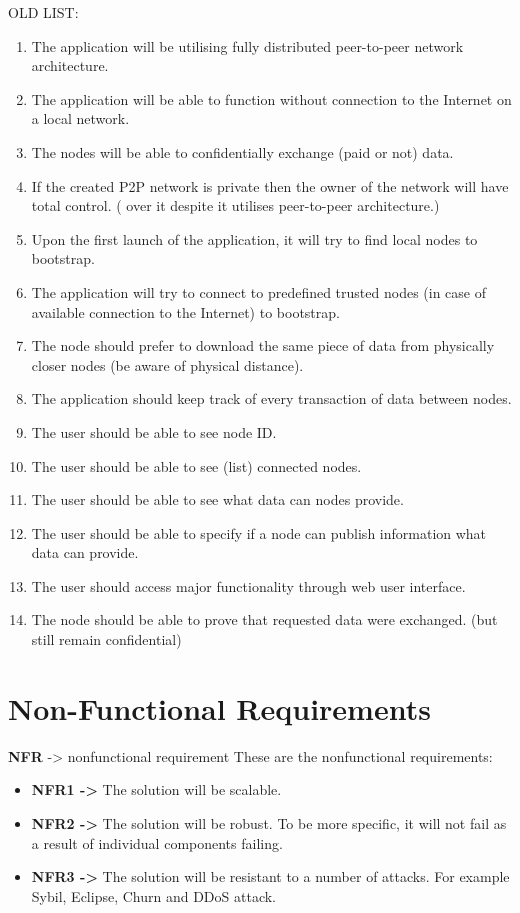 OLD LIST:
\begin{enumerate}
\item The application will be utilising fully distributed peer-to-peer network architecture.
\item The application will be able to function without connection to the Internet on a local network.
\item The nodes will be able to confidentially exchange (paid or not) data.
\item If the created P2P network is private then the owner of the network will have total control. ( over it despite it utilises peer-to-peer architecture.)
\item Upon the first launch of the application, it will try to find local nodes to bootstrap.
\item The application will try to connect to predefined trusted nodes (in case of available connection to the Internet) to bootstrap.
\item The node should prefer to download the same piece of data from physically closer nodes (be aware of physical distance).
\item The application should keep track of every transaction of data between nodes.
\item The user should be able to see node ID.
\item The user should be able to see (list) connected nodes.
\item The user should be able to see what data can nodes provide.
\item The user should be able to specify if a node can publish information what data can provide.
\item The user should access major functionality through web user interface.
\item The node should be able to prove that requested data were exchanged. (but still remain confidential)
\end{enumerate}

\vspace{\baselineskip}

\section{Non-Functional Requirements}
\textbf{NFR} -> nonfunctional requirement  \newline
These are the nonfunctional requirements:

\begin{itemize}
\item \textbf{NFR1 ->} The solution will be scalable.
\item \textbf{NFR2 ->} The solution will be robust. To be more specific, it will not fail as a result of individual components failing.
\item \textbf{NFR3 ->} The solution will be resistant to a number of attacks. For example Sybil, Eclipse, Churn and DDoS attack.
\end{itemize}
\vspace{\baselineskip}

